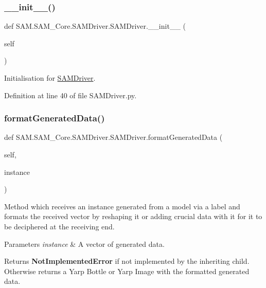 \subsubsection{\texorpdfstring{\+\_\+\+\_\+init\+\_\+\+\_\+()}{\_\_init\_\_()}}
{\footnotesize\ttfamily def S\+A\+M.\+S\+A\+M\+\_\+\+Core.\+S\+A\+M\+Driver.\+S\+A\+M\+Driver.\+\_\+\+\_\+init\+\_\+\+\_\+ (\begin{DoxyParamCaption}\item[{}]{self }\end{DoxyParamCaption})}



Initialisation for \hyperlink{group__icubclient__SAM__Drivers_classSAM_1_1SAM__Core_1_1SAMDriver_1_1SAMDriver}{S\+A\+M\+Driver}. 



Definition at line 40 of file S\+A\+M\+Driver.\+py.

\mbox{\label{group__icubclient__SAM__Drivers_gaac21747b09e36216d09a23bd726cf62d}} 
\subsubsection{\texorpdfstring{format\+Generated\+Data()}{formatGeneratedData()}}
{\footnotesize\ttfamily def S\+A\+M.\+S\+A\+M\+\_\+\+Core.\+S\+A\+M\+Driver.\+S\+A\+M\+Driver.\+format\+Generated\+Data (\begin{DoxyParamCaption}\item[{}]{self,  }\item[{}]{instance }\end{DoxyParamCaption})}



Method which receives an instance generated from a model via a label and formats the received vector by reshaping it or adding crucial data with it for it to be deciphered at the receiving end. 


\begin{DoxyParams}{Parameters}
{\em instance} & A vector of generated data.\\
\hline
\end{DoxyParams}
\begin{DoxyReturn}{Returns}
{\bfseries Not\+Implemented\+Error} if not implemented by the inheriting child. Otherwise returns a Yarp Bottle or Yarp Image with the formatted generated data. 
\end{DoxyReturn}


